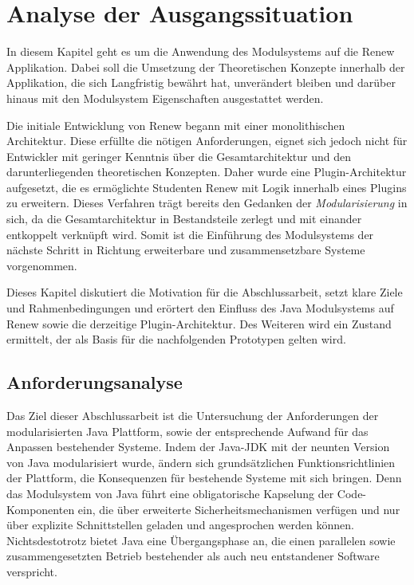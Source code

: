\chapter{Analyse der Ausgangssituation}\label{cha:ausgangssituation}
In diesem Kapitel geht es um die Anwendung des Modulsystems auf die Renew Applikation. Dabei soll die Umsetzung der Theoretischen Konzepte innerhalb der Applikation, die sich Langfristig bewährt hat, unverändert bleiben und darüber hinaus mit den Modulsystem Eigenschaften ausgestattet werden. \bigbreak

Die initiale Entwicklung von Renew begann mit einer monolithischen Architektur. Diese erfüllte die nötigen Anforderungen, eignet sich jedoch nicht für Entwickler mit geringer Kenntnis über die Gesamtarchitektur und den darunterliegenden theoretischen Konzepten. Daher wurde eine Plugin-Architektur aufgesetzt, die es ermöglichte Studenten Renew mit Logik innerhalb eines Plugins zu erweitern. Dieses Verfahren trägt bereits den Gedanken der \textit{Modularisierung} in sich, da die Gesamtarchitektur in Bestandsteile zerlegt und mit einander entkoppelt verknüpft wird. Somit ist die Einführung des Modulsystems der nächste Schritt in Richtung erweiterbare und zusammensetzbare Systeme vorgenommen. \bigbreak

Dieses Kapitel diskutiert die Motivation für die Abschlussarbeit, setzt klare Ziele und Rahmenbedingungen und erörtert den Einfluss des Java Modulsystems auf Renew sowie die derzeitige Plugin-Architektur. Des Weiteren wird ein Zustand ermittelt, der als Basis für die nachfolgenden Prototypen gelten wird.

\section{Anforderungsanalyse} 
	Das Ziel dieser Abschlussarbeit ist die Untersuchung der Anforderungen der modularisierten Java Plattform, sowie der entsprechende Aufwand für das Anpassen bestehender Systeme. \bigbreak
	Indem der Java-JDK mit der neunten Version von Java modularisiert wurde, ändern sich grundsätzlichen Funktionsrichtlinien der Plattform, die Konsequenzen für bestehende Systeme mit sich bringen. Denn das Modulsystem von Java führt eine obligatorische Kapselung der Code-Komponenten ein, die über erweiterte Sicherheitsmechanismen verfügen und nur über explizite Schnittstellen geladen und angesprochen werden können.\newline 
	Nichtsdestotrotz bietet Java eine Übergangsphase an, die einen parallelen sowie zusammengesetzten Betrieb bestehender als auch neu entstandener Software verspricht.\bigbreak

